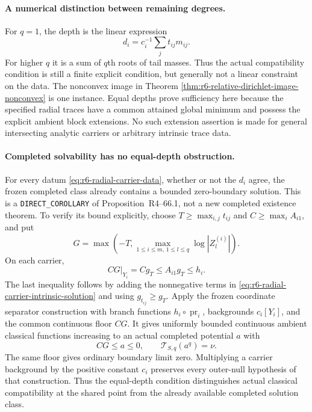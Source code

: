 \documentclass[11pt,a4paper]{article}
\numberwithin{equation}{section}
\theoremstyle{definition}
\theoremstyle{remark}
\begin{document}
\paragraph{A numerical distinction between remaining degrees.}
For $q=1$, the depth is the linear expression
\[
                       d_i=c_i^{-1}\sum_j t_{ij}m_{ij}.
\]
For higher $q$ it is a sum of $q$th roots of tail masses. Thus
the actual compatibility condition is still a finite explicit
condition, but generally not a linear constraint on the data.
The nonconvex image in Theorem
\ref{thm:r6-relative-dirichlet-image-nonconvex} is one instance.
Equal depths prove sufficiency here because the specified radial
traces have a common attained global minimum and possess the
explicit ambient block extensions. No such extension assertion is
made for general intersecting analytic carriers or arbitrary
intrinsic trace data.

\paragraph{Completed solvability has no equal-depth obstruction.}
For every datum \eqref{eq:r6-radial-carrier-data}, whether or not the
$d_i$ agree, the frozen completed class already contains a bounded
zero-boundary solution. This is a \texttt{DIRECT\_COROLLARY} of
Proposition~\textup{R4--66.1}, not a new
completed existence theorem. To verify its bound explicitly, choose
$T\ge\max_{i,j}t_{ij}$ and $C\ge\max_i A_{i1}$, and put
\[
 G=\max\left(-T,\max_{1\le i\le m,\,1\le l\le q}
                                   \log|Z^{(i)}_l|\right).
\]
On each carrier,
\[
          CG|_{Y_i}=C g_T\le A_{i1}g_T\le h_i.
\]
The last inequality follows by adding the nonnegative terms in
\eqref{eq:r6-radial-carrier-intrinsic-solution} and using
$g_{t_{ij}}\ge g_T$. Apply the frozen coordinate separator
construction with branch functions $h_i\circ\operatorname{pr}_i$,
backgrounds $c_i[Y_i]$, and the common continuous floor $CG$.
It gives uniformly bounded continuous ambient classical functions
increasing to an actual completed potential $a$ with
\[
       CG\le a\le0,\qquad \mathcal T_{S,q}(a^q)=\nu.
\]
The same floor gives ordinary boundary limit zero. Multiplying a
carrier background by the positive constant $c_i$ preserves every
outer-null hypothesis of that construction. Thus the equal-depth
condition distinguishes actual classical compatibility at the
shared point from the already available completed solution class.

\end{document}
